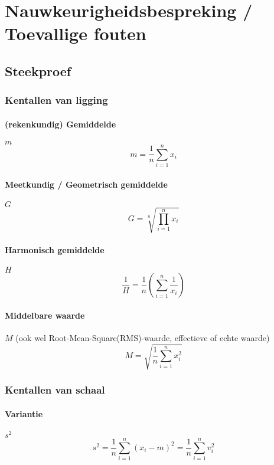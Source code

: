 \newpage
\section{Nauwkeurigheidsbespreking / Toevallige fouten}
\label{sec:NauwkeurigheidsbesprekingToevalligeFouten}
  
  \subsection{Steekproef}
  \label{sec:Steekproef}
    
    \subsubsection{Kentallen van ligging}
    \label{sec:KentallenVanLigging}
    
      \paragraph{(rekenkundig) Gemiddelde} $m$
      \label{sec:RekenkundigGemiddelde}
        \[
          m = \frac{1}{n} \sum_{i=1}^n x_i
        \]
      \paragraph{Meetkundig / Geometrisch gemiddelde} $G$
      \label{sec:MeetkundigGemiddelde}
        \[
          G = \sqrt[n]{\prod_{i=1}^n x_i}
        \]
      \paragraph{Harmonisch gemiddelde} $H$
      \label{sec:HarmonischGemiddelde}
        \[
          \frac{1}{H} = \frac{1}{n} \left( \sum_{i=1}^n \frac{1}{x_i}\right)
        \]
      \paragraph{Middelbare waarde} $M$ (ook wel Root-Mean-Square(RMS)-waarde, effectieve of echte waarde)
      \label{sec:Middelbare waarde}
        \[
          M = \sqrt{\frac{1}{n}\sum_{i=1}^n x_i^2}
        \]
    
    \subsubsection{Kentallen van schaal}
    \label{sec:KentallenVanSchaal}
      
      \paragraph{Variantie} $s^2$
      \label{sec:Variantie}
        \[
          s^2 = \frac{1}{n} \sum^n_{i=1} \left(x_i - m\right)^2 = \frac{1}{n} \sum^n_{i=1} v_i^2
        \]
